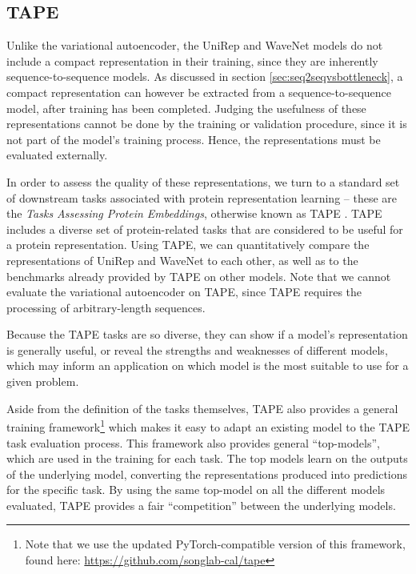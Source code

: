 \subsection{TAPE}
\label{sec:tape}
Unlike the variational autoencoder, the UniRep and WaveNet models do not include a compact representation in their training, since they are inherently sequence-to-sequence models. As discussed in section \ref{sec:seq2seqvsbottleneck}, a compact representation can however be extracted from a sequence-to-sequence model, after training has been completed. Judging the usefulness of these representations cannot be done by the training or validation procedure, since it is not part of the model's training process. Hence, the representations must be evaluated externally.

In order to assess the quality of these representations, we turn to a standard set of downstream tasks associated with protein representation learning -- these are the \textit{Tasks Assessing Protein Embeddings}, otherwise known as TAPE \cite{tape2019}. TAPE includes a diverse set of protein-related tasks that are considered to be useful for a protein representation. Using TAPE, we can quantitatively compare the representations of UniRep and WaveNet to each other, as well as to the benchmarks already provided by TAPE on other models. Note that we cannot evaluate the variational autoencoder on TAPE, since TAPE requires the processing of arbitrary-length sequences.

Because the TAPE tasks are so diverse, they can show if a model's representation is generally useful, or reveal the strengths and weaknesses of different models, which may inform an application on which model is the most suitable to use for a given problem.

Aside from the definition of the tasks themselves, TAPE also provides a general training framework\footnote{Note that we use the updated PyTorch-compatible version of this framework, found here: \url{https://github.com/songlab-cal/tape}} which makes it easy to adapt an existing model to the TAPE task evaluation process. This framework also provides general ``top-models'', which are used in the training for each task. The top models learn on the outputs of the underlying model, converting the representations produced into predictions for the specific task. By using the same top-model on all the different models evaluated, TAPE provides a fair ``competition'' between the underlying models.

